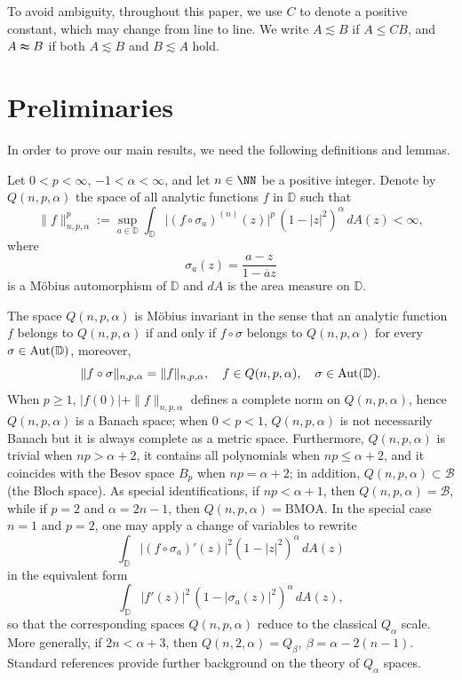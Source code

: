 \documentclass[12pt, reqno]{amsart}
\begin{document}
To avoid ambiguity, throughout this paper, we use $C$ to denote a positive constant, which may change from line to line. We write $A \lesssim B$ if $A \leq C B$, and $A \thickapprox B$ if both $A \lesssim B$ and $B \lesssim A$ hold.

\section{Preliminaries}\label{section02}

In order to prove our main results, we need the following definitions and lemmas.

\begin{definition}\label{def:Qnpa}
{\rm Let $0<p<\infty$, $-1<\alpha<\infty$, and let $n\in\NN$ be a positive integer. Denote by $Q(n,p,\alpha)$ the space of all analytic functions $f$ in $\mathbb D$ such that
\[
\|f\|^{p}_{n,p,\alpha}
:=\sup_{a\in\mathbb D}\int_{\mathbb D}\bigl|(f\circ \sigma_a)^{(n)}(z)\bigr|^{p}\,(1-|z|^{2})^{\alpha}\,dA(z)<\infty,
\]
where $$\sigma_a(z)=\dfrac{a-z}{1-\overline{a}z}$$ is a M\"obius automorphism of $\mathbb D$ and $dA$ is the area measure on $\mathbb D$.}
\end{definition}

The space $Q(n,p,\alpha)$ is M\"obius invariant in the sense that an analytic function $f$ belongs to $Q(n,p,\alpha)$ if and only if $f\circ\sigma$ belongs to $Q(n,p,\alpha)$ for every $\sigma\in {\rm Aut}(\mathbb D)$, moreover,
\[
\|f\circ\sigma\|_{n,p,\alpha}=\|f\|_{n,p,\alpha},\quad f\in Q(n,p,\alpha),\quad \sigma\in {\rm Aut}(\mathbb D).
\]
When $p\ge1$, $|f(0)|+\|f\|_{n,p,\alpha}$ defines a complete norm on $Q(n,p,\alpha)$, hence $Q(n,p,\alpha)$ is a Banach space; when $0<p<1$, $Q(n,p,\alpha)$ is not necessarily Banach but it is always complete as a metric space. Furthermore, $Q(n,p,\alpha)$ is trivial when $np>\alpha+2$, it contains all polynomials when $np\le \alpha+2$, and it coincides with the Besov space $B_p$ when $np=\alpha+2$; in addition, $Q(n,p,\alpha)\subset\mathcal{B}$ (the Bloch space). As special identifications, if $np<\alpha+1$, then $Q(n,p,\alpha)=\mathcal{B}$, while if $p=2$ and $\alpha=2n-1$, then $Q(n,p,\alpha)=\mathrm{BMOA}$. In the special case $n=1$ and $p=2$, one may apply a change of variables to rewrite
\[
\int_{\mathbb D}\bigl|(f\circ\sigma_a)'(z)\bigr|^{2}(1-|z|^{2})^{\alpha}\,dA(z)
\]
in the equivalent form
\[
\int_{\mathbb D}|f'(z)|^{2}\,(1-|\sigma_a(z)|^{2})^{\alpha}\,dA(z),
\]
so that the corresponding spaces $Q(n,p,\alpha)$ reduce to the classical $Q_{\alpha}$ scale. More generally, if $2n<\alpha+3$, then
$Q(n,2,\alpha)=Q_{\beta},~\beta=\alpha-2(n-1).$
Standard references \cite{XJ1} provide further background on the theory of $Q_{\alpha}$ spaces.
\end{document}
